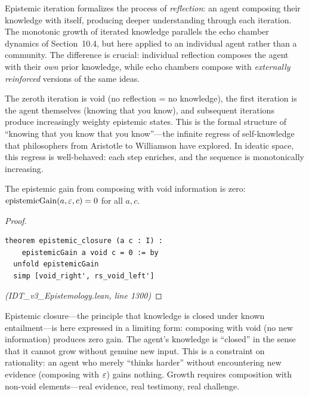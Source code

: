\begin{interpretation}
Epistemic iteration formalizes the process of \emph{reflection}: an agent
composing their knowledge with itself, producing deeper understanding through
each iteration. The monotonic growth of iterated knowledge parallels the echo
chamber dynamics of Section~10.4, but here applied to an individual agent
rather than a community. The difference is crucial: individual reflection
composes the agent with their \emph{own} prior knowledge, while echo chambers
compose with \emph{externally reinforced} versions of the same ideas.

The zeroth iteration is void (no reflection = no knowledge), the first
iteration is the agent themselves (knowing that you know), and subsequent
iterations produce increasingly weighty epistemic states. This is the formal
structure of ``knowing that you know that you know''---the infinite regress
of self-knowledge that philosophers from Aristotle to Williamson have explored.
In ideatic space, this regress is well-behaved: each step enriches, and the
sequence is monotonically increasing.
\end{interpretation}

\begin{theorem}
\label{thm:epistemic-closure}
The epistemic gain from composing with void information is zero:
$\mathrm{epistemicGain}(a, \varepsilon, c) = 0$ for all $a, c$.
\end{theorem}

\begin{proof}
\begin{lstlisting}
theorem epistemic_closure (a c : I) :
    epistemicGain a void c = 0 := by
  unfold epistemicGain
  simp [void_right', rs_void_left']
\end{lstlisting}
\textit{(IDT\_v3\_Epistemology.lean, line 1300)}
\end{proof}

\begin{interpretation}
Epistemic closure---the principle that knowledge is closed under known
entailment---is here expressed in a limiting form: composing with void (no new
information) produces zero gain. The agent's knowledge is ``closed'' in the
sense that it cannot grow without genuine new input. This is a constraint on
rationality: an agent who merely ``thinks harder'' without encountering new
evidence (composing with $\varepsilon$) gains nothing. Growth requires composition
with non-void elements---real evidence, real testimony, real challenge.
\end{interpretation}

